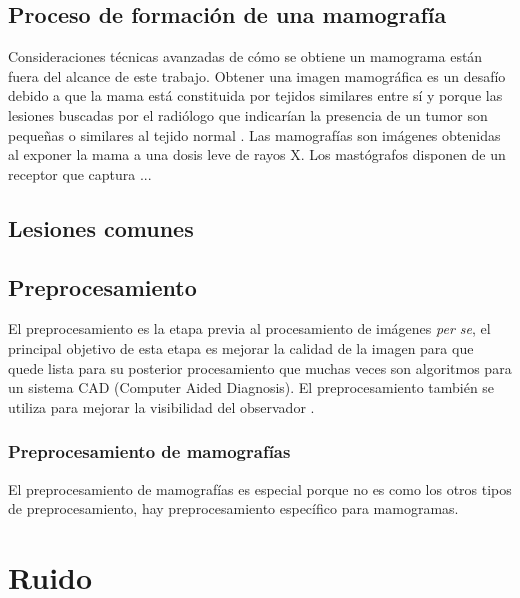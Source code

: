 \subsection{Proceso de formación de una mamografía}

Consideraciones técnicas avanzadas de cómo se obtiene un mamograma están fuera
del alcance de este trabajo. Obtener una imagen mamográfica es un desafío
debido a que la mama está constituida por tejidos similares entre sí y porque
las lesiones buscadas por el radiólogo que indicarían la presencia de un tumor
son pequeñas o similares al tejido normal \cite{mxcancer}. Las mamografías son
imágenes obtenidas al exponer la mama a una dosis leve de rayos X. Los
mastógrafos disponen de un receptor que captura ...


\subsection{Lesiones comunes}


\subsection{Preprocesamiento}
El preprocesamiento es la etapa previa al procesamiento de imágenes \textit{per
se}, el principal objetivo de esta etapa es mejorar la calidad de la imagen
para que quede lista para su posterior procesamiento \cite{ponraj2011survey}
que muchas veces son algoritmos para un sistema CAD (Computer Aided Diagnosis).
El preprocesamiento también se utiliza para mejorar la visibilidad del
observador \cite{rahmati2010new}. 

\subsubsection{Preprocesamiento de mamografías}
El preprocesamiento de mamografías es especial porque no es como los otros tipos
de preprocesamiento, hay preprocesamiento específico para mamogramas.

\section{Ruido}

